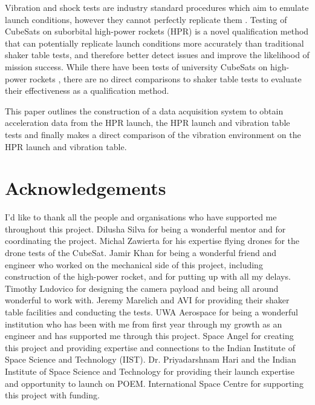 \documentclass[a4paper,11pt]{article}
\begin{document}
Vibration and shock tests are industry standard procedures which aim to emulate launch conditions, however they cannot perfectly replicate them \cite{gordon2015benefits}. Testing of CubeSats on suborbital high-power rockets (HPR) is a novel qualification method that can potentially replicate launch conditions more accurately than traditional shaker table tests, and therefore better detect issues and improve the likelihood of mission success. While there have been tests of university CubeSats on high-power rockets \cite{slongo2019pre}, there are no direct comparisons to shaker table tests to evaluate their effectiveness as a qualification method.

This paper outlines the construction of a data acquisition system to obtain acceleration data from the HPR launch, the HPR launch and vibration table tests and finally makes a direct comparison of the vibration environment on the HPR launch and vibration table.


\section{Acknowledgements}

I'd like to thank all the people and organisations who have supported me throughout this project. Dilusha Silva for being a wonderful mentor and for coordinating the project. Michal Zawierta for his expertise flying drones for the drone tests of the CubeSat. Jamir Khan for being a wonderful friend and engineer who worked on the mechanical side of this project, including construction of the high-power rocket, and for putting up with all my delays. Timothy Ludovico for designing the camera payload and being all around wonderful to work with. Jeremy Marelich and AVI for providing their shaker table facilities and conducting the tests. UWA Aerospace for being a wonderful institution who has been with me from first year through my growth as an engineer and has supported me through this project. Space Angel for creating this project and providing expertise and connections to the Indian Institute of Space Science and Technology (IIST). Dr. Priyadarshnam Hari and the Indian Institute of Space Science and Technology for providing their launch expertise and opportunity to launch on POEM. International Space Centre for supporting this project with funding. 


\newpage
\tableofcontents
\newpage

\end{document}
